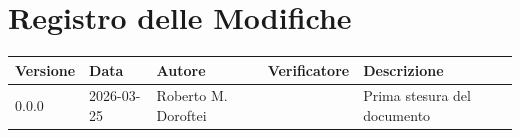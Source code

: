 \section*{Registro delle Modifiche}
\begin{table}[ht]
	\centering
	\renewcommand{\arraystretch}{1.5}
	\begin{tabularx}{\textwidth}{l l l l X}
		\toprule
		\textbf{Versione} & \textbf{Data} & \textbf{Autore} & \textbf{Verificatore} & \textbf{Descrizione} \\
		\midrule
		0.0.0 & 2026-03-25 & Roberto M. Doroftei &  & Prima stesura del documento \\
		\bottomrule
	\end{tabularx}
\end{table}